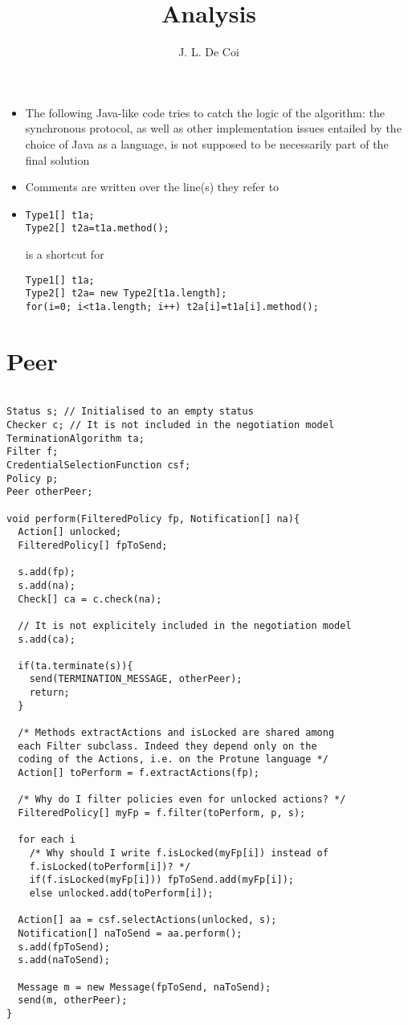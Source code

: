 \documentclass{article}
\begin{document}
\title{Analysis}
\author{J. L. De Coi}
\maketitle

\begin{itemize}
	\item The following Java-like code tries to catch the logic of the algorithm: the synchronous protocol, as well as other implementation issues entailed by the choice of Java as a language, is not supposed to be necessarily part of the final solution
	\item Comments are written over the line(s) they refer to
	\item
\begin{verbatim}
Type1[] t1a;
Type2[] t2a=t1a.method();

\end{verbatim}
is a shortcut for
\begin{verbatim}
Type1[] t1a;
Type2[] t2a= new Type2[t1a.length];
for(i=0; i<t1a.length; i++) t2a[i]=t1a[i].method();
\end{verbatim}
\end{itemize}

\section{Peer}

\begin{verbatim}

Status s; // Initialised to an empty status
Checker c; // It is not included in the negotiation model
TerminationAlgorithm ta;
Filter f;
CredentialSelectionFunction csf;
Policy p;
Peer otherPeer;

void perform(FilteredPolicy fp, Notification[] na){
  Action[] unlocked;
  FilteredPolicy[] fpToSend;
  
  s.add(fp);
  s.add(na);
  Check[] ca = c.check(na);
  
  // It is not explicitely included in the negotiation model
  s.add(ca);
  
  if(ta.terminate(s)){
    send(TERMINATION_MESSAGE, otherPeer);
    return;
  }
  
  /* Methods extractActions and isLocked are shared among
  each Filter subclass. Indeed they depend only on the
  coding of the Actions, i.e. on the Protune language */
  Action[] toPerform = f.extractActions(fp);
  
  /* Why do I filter policies even for unlocked actions? */
  FilteredPolicy[] myFp = f.filter(toPerform, p, s);
  
  for each i
    /* Why should I write f.isLocked(myFp[i]) instead of
    f.isLocked(toPerform[i])? */
    if(f.isLocked(myFp[i])) fpToSend.add(myFp[i]);
    else unlocked.add(toPerform[i]);

  Action[] aa = csf.selectActions(unlocked, s);
  Notification[] naToSend = aa.perform();
  s.add(fpToSend);
  s.add(naToSend);
  
  Message m = new Message(fpToSend, naToSend);
  send(m, otherPeer);
}

\end{verbatim}
\end{document}
